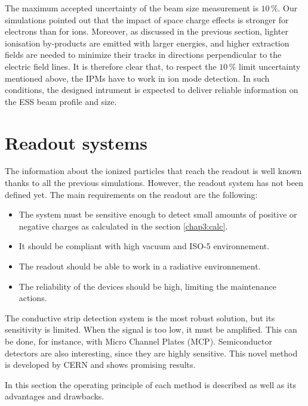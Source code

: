 \begin{refsection}
  

  The maximum accepted uncertainty of the beam size measurement is $10\,\mathrm{\%}$. Our simulations pointed out that the impact of space charge effects  is stronger for electrons than for ions. Moreover, as discussed in the previous section,  lighter ionisation by-products are emitted with larger energies, and higher extraction fields are needed to minimize their tracks in directions perpendicular to the electric field lines. It is therefore clear that, to respect the $10\,\mathrm{\%}$ limit uncertainty mentioned above, the IPMs have to work in ion mode detection. In such conditions,  the designed intrument  is expected to deliver reliable information on the ESS beam profile and size.


  \section{Readout systems}
  The information about the ionized particles that reach the readout is well known thanks to all the previous simulations. However, the readout system has not been defined yet. The main requirements on the readout are the following:
  \begin{itemize}
    \item The system must be sensitive enough to detect small amounts of positive or negative charges as calculated in the section \ref{chap3:calc}.
    \item It should be compliant with high vacuum and ISO-5 environnement.
    \item The readout should be able to work in a radiative environnement.
    \item The reliability of the devices should be high, limiting the maintenance actions.
  \end{itemize}

  The conductive strip detection system is the most robust solution, but its sensitivity is limited. When the signal is too low, it must be amplified. This can be done, for instance, with Micro Channel Plates (MCP). Semiconductor detectors are also interesting, since they are highly sensitive. This novel method is developed by CERN and shows promising results.

  In this section the operating principle of each method is described as well as its advantages and drawbacks.


\end{refsection}
